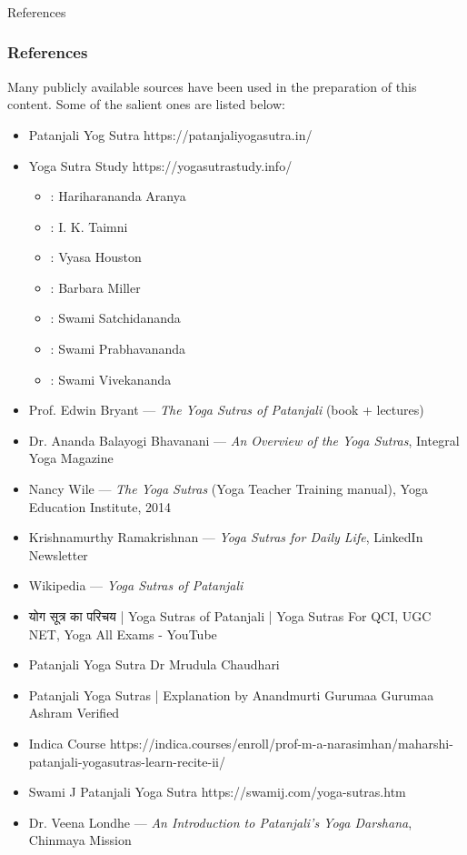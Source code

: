 \begin{frame}[fragile]\frametitle{}
\begin{center}
{\Large References}
\end{center}
\end{frame}


\begin{frame}[fragile]\frametitle{References}

Many publicly available sources have been used in the preparation of this content. Some of the salient ones are listed below:

	\begin{itemize}
	\item Patanjali Yog Sutra https://patanjaliyogasutra.in/
	\item Yoga Sutra Study https://yogasutrastudy.info/
		\begin{itemize}
		\item [HA]: Hariharananda Aranya
		\item [IT]: I. K. Taimni
		\item [VH]: Vyasa Houston
		\item [BM]: Barbara Miller
		\item [SS]: Swami Satchidananda
		\item [SP]: Swami Prabhavananda
		\item [SV]: Swami Vivekananda
		\end{itemize}
	\item Prof. Edwin Bryant — \emph{The Yoga Sutras of Patanjali} (book + lectures)
	\item Dr. Ananda Balayogi Bhavanani — \emph{An Overview of the Yoga Sutras}, Integral Yoga Magazine
	\item Nancy Wile — \emph{The Yoga Sutras} (Yoga Teacher Training manual), Yoga Education Institute, 2014
	\item Krishnamurthy Ramakrishnan — \emph{Yoga Sutras for Daily Life}, LinkedIn Newsletter
	\item Wikipedia — \emph{Yoga Sutras of Patanjali}
	\item योग सूत्र का परिचय | Yoga Sutras of Patanjali | Yoga Sutras For QCI, UGC NET, Yoga All Exams - YouTube
	\item Patanjali Yoga Sutra Dr Mrudula Chaudhari
	\item Patanjali Yoga Sutras | Explanation by Anandmurti Gurumaa Gurumaa Ashram Verified
	\item Indica Course https://indica.courses/enroll/prof-m-a-narasimhan/maharshi-patanjali-yogasutras-learn-recite-ii/
	\item Swami J Patanjali Yoga Sutra https://swamij.com/yoga-sutras.htm
	\item Dr. Veena Londhe — \emph{An Introduction to Patanjali's Yoga Darshana}, Chinmaya Mission
	\end{itemize}

\end{frame}

